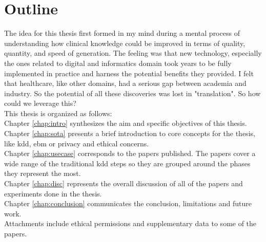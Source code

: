 \chapter*{Outline}


The idea for this thesis first formed in my mind during a mental process of understanding how clinical knowledge could be improved in terms of quality, quantity, and speed of generation. The feeling was that new technology, especially the ones related to digital and informatics domain took years to be fully implemented in practice and harness the potential benefits they provided. I felt that healthcare, like other domains, had a serious gap between academia and industry. So the potential of all these discoveries was lost in "translation".
So how could we leverage this? \\
This thesis is organized as follows:\\
Chapter \ref{chap:intro} synthesizes the aim and specific objectives of this thesis.
Chapter \ref{chap:sota} presents a brief introduction to core concepts for the thesis, like \ac{kdd}, \ac{ebm} or privacy and ethical concerns.\\
Chapter \ref{chap:usecase} corresponds to the papers published. The papers cover a wide range of the traditional \ac{kdd} steps so they are grouped around the phases they represent the most.\\

Chapter \ref{chap:disc} represents the overall discussion of all of the papers and experiments done in the thesis.\\

Chapter \ref{chap:conclusion} communicates the conclusion, limitations and future work.\\

Attachments include ethical permissions and supplementary data to some of the papers.
